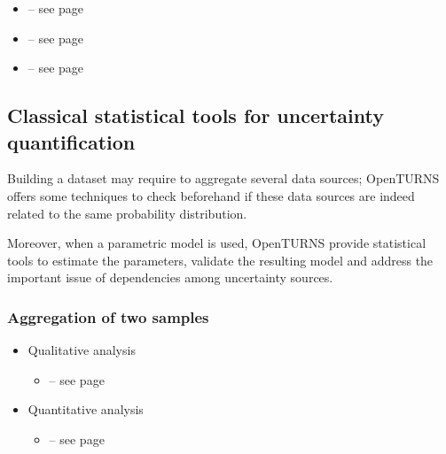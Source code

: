 \begin{itemize}

\item {}  -- see page \pageref{docref_B121_DistributionSelection} \vspace{2mm}
\item {}  -- see page \pageref{docref_B122_Copulas} \vspace{2mm}
\item {}  -- see page \pageref{docref_B122_RandomMixture} \vspace{2mm}

\end{itemize}

\subsection{Classical statistical tools for uncertainty quantification}

Building a dataset may require to aggregate several data sources; OpenTURNS offers some techniques to check beforehand if these data sources are indeed related to the same probability distribution.

Moreover, when a parametric model is used, OpenTURNS provide statistical tools to estimate the parameters, validate the resulting model and address the important issue of dependencies among uncertainty sources.

\subsubsection{Aggregation of two samples}

\begin{itemize}

\item Qualitative analysis
\begin{itemize}
\item {} -- see page \pageref{docref_B201_Graph}
\end{itemize}
\item Quantitative analysis
\begin{itemize}
\item {} -- see page \pageref{docref_B202_Smirnov}
\end{itemize}
\end{itemize}

